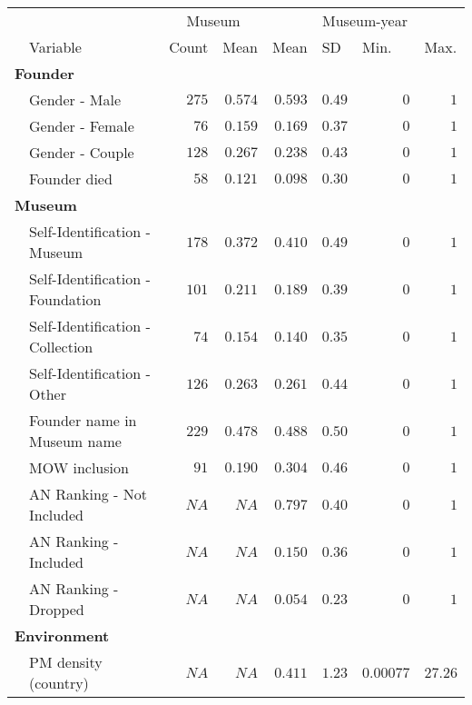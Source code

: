 \documentclass[12pt]{article}
\begin{document}
\begin{table}[ht]
\centering
\begin{tabular}{llrrrrrr}
  \hline
 & & \multicolumn{2}{c}{Museum} & \multicolumn{4}{c}{Museum-year} \\ 
\cmidrule(r){3-4}\cmidrule(r){5-8} \multicolumn{1}{l}{} & \multicolumn{1}{l}{Variable} & \multicolumn{1}{l}{Count} & \multicolumn{1}{l}{Mean} & \multicolumn{1}{l}{Mean} & \multicolumn{1}{l}{SD} & \multicolumn{1}{l}{Min.} & \multicolumn{1}{l}{Max.}\\ 
 \hline
  \multicolumn{8}{l}{\textbf{Founder}} \\ 
 & Gender - Male & $275$ & $0.574$ & $  0.593$ & $  0.49$ & $0$ & $1$ \\ 
   & Gender - Female & $76$ & $0.159$ & $  0.169$ & $  0.37$ & $0$ & $1$ \\ 
   & Gender - Couple & $128$ & $0.267$ & $  0.238$ & $  0.43$ & $0$ & $1$ \\ 
   & Founder died & $58$ & $0.121$ & $  0.098$ & $  0.30$ & $0$ & $1$ \\ 
   \multicolumn{8}{l}{\textbf{Museum}} \\ 
 & Self-Identification - Museum & $178$ & $0.372$ & $  0.410$ & $  0.49$ & $0$ & $1$ \\ 
   & Self-Identification - Foundation & $101$ & $0.211$ & $  0.189$ & $  0.39$ & $0$ & $1$ \\ 
   & Self-Identification - Collection & $74$ & $0.154$ & $  0.140$ & $  0.35$ & $0$ & $1$ \\ 
   & Self-Identification - Other & $126$ & $0.263$ & $  0.261$ & $  0.44$ & $0$ & $1$ \\ 
   & Founder name in Museum name & $229$ & $0.478$ & $  0.488$ & $  0.50$ & $0$ & $1$ \\ 
   & MOW inclusion & $91$ & $0.190$ & $  0.304$ & $  0.46$ & $0$ & $1$ \\ 
   & AN Ranking - Not Included & $NA$ & $NA$ & $  0.797$ & $  0.40$ & $0$ & $1$ \\ 
   & AN Ranking - Included & $NA$ & $NA$ & $  0.150$ & $  0.36$ & $0$ & $1$ \\ 
   & AN Ranking - Dropped & $NA$ & $NA$ & $  0.054$ & $  0.23$ & $0$ & $1$ \\ 
   \multicolumn{8}{l}{\textbf{Environment}} \\ 
 & PM density (country) & $NA$ & $NA$ & $  0.411$ & $  1.23$ & $0.00077$ & $27.26$ \\ 

\end{tabular}
\end{table}
\end{document}
